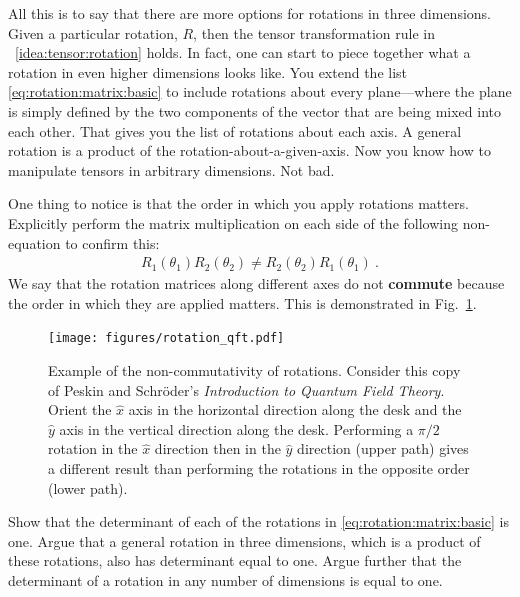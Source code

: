 \documentclass[12pt]{article}
\begin{document}
All this is to say that there are more options for rotations in three dimensions. Given a particular rotation, $R$, then the tensor transformation rule in \bigidearef~\ref{idea:tensor:rotation} holds. In fact, one can start to piece together what a rotation in even higher dimensions looks like. You extend the list \eqref{eq:rotation:matrix:basic} to include rotations about every plane---where the plane is simply defined by the two components of the vector that are being mixed into each other. That gives you the list of rotations about each axis. A general rotation is a product of the rotation-about-a-given-axis. Now you know how to manipulate tensors in arbitrary dimensions. Not bad.

\begin{exercise}
One thing to notice is that the order in which you apply rotations matters. Explicitly perform the matrix multiplication on each side of the following non-equation to confirm this:
\begin{align}
    R_1(\theta_1) R_2(\theta_2) \neq R_2(\theta_2) R_1(\theta_1) \ .
\end{align}
We say that the rotation matrices along different axes do not \textbf{commute} because the order in which they are applied matters. This is demonstrated in Fig.~\ref{fig:rotate:QFT}.
\end{exercise}


\begin{figure}[tb]
    \centering
    \texttt{[image: figures/rotation\_qft.pdf]}
    \caption{Example of the non-commutativity of rotations. Consider this copy of Peskin and Schr\"oder's \emph{Introduction to Quantum Field Theory}. Orient the $\hat x$ axis in the horizontal direction along the desk and the $\hat y$ axis in the vertical direction along the desk. Performing a $\pi/2$ rotation in the $\hat x$ direction then in the $\hat y$ direction (upper path) gives a different result than performing the rotations in the opposite order (lower path).}
    \label{fig:rotate:QFT}
\end{figure}

\begin{exercise}
Show that the determinant of each of the rotations in \eqref{eq:rotation:matrix:basic} is one. Argue that a general rotation in three dimensions, which is a product of these rotations, also has determinant equal to one. Argue further that the determinant of a rotation in any number of dimensions is equal to one.
\end{exercise}
\end{document}
